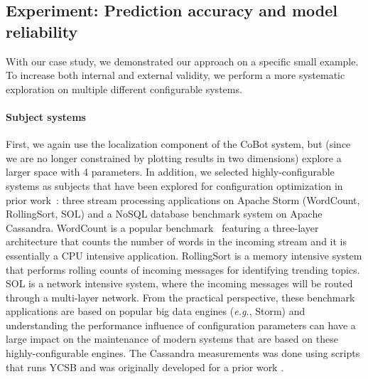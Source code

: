 \subsection{Experiment: Prediction accuracy and model reliability}

With our case study, we demonstrated our approach on a specific small example.
To increase both internal and external validity, we perform a more systematic
exploration on multiple different configurable systems.

\paragraph*{Subject systems}
First, we again use the localization component of the CoBot system, but (since we are no longer constrained by plotting results in two dimensions) explore a larger space with 4 parameters.
In addition, we selected highly-configurable systems as subjects that have been explored for
configuration optimization in prior work~\cite{jamshidi2016bo4co}: three stream processing applications on Apache Storm
({\sf \small WordCount, RollingSort, SOL}) and a NoSQL database benchmark system on Apache Cassandra.
{\sf \small WordCount} is a popular benchmark~\cite{ghazal2013bigbench} featuring a three-layer architecture that counts the number of words in the incoming stream and it is essentially a CPU intensive application. {\sf \small RollingSort}  is a memory intensive system that performs rolling counts of incoming messages for identifying trending topics.
{\sf \small SOL} is a network intensive system, where the incoming messages will be routed through a multi-layer network.
From the practical perspective, these benchmark applications are based on popular big data engines (\emph{e.g.}, Storm) and understanding the performance influence of configuration parameters can have a large impact on the maintenance of modern systems that are based on these highly-configurable engines. The Cassandra measurements was done using scripts that runs YCSB \cite{cooper2010benchmarking} and was originally developed for a prior work \cite{artavc2017dice}.

